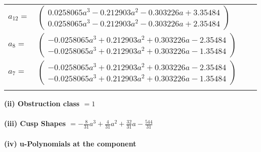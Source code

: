\documentclass[1p]{elsarticle_modified}
\theoremstyle{definition}
\begin{document}
\begin{tabular}{m{7pt} m{180pt} m{7pt} m{180pt} }
\flushright $a_{12}=$&$\begin{pmatrix}0.0258065 a^{3}-0.212903 a^{2}-0.303226 a+3.35484\\0.0258065 a^{3}-0.212903 a^{2}-0.303226 a+2.35484\end{pmatrix}$ \\
\flushright $a_{8}=$&$\begin{pmatrix}-0.0258065 a^{3}+0.212903 a^{2}+0.303226 a-2.35484\\-0.0258065 a^{3}+0.212903 a^{2}+0.303226 a-1.35484\end{pmatrix}$ \\
\flushright $a_{7}=$&$\begin{pmatrix}-0.0258065 a^{3}+0.212903 a^{2}+0.303226 a-2.35484\\-0.0258065 a^{3}+0.212903 a^{2}+0.303226 a-1.35484\end{pmatrix}$\\&\end{tabular}
\flushleft \textbf{(ii) Obstruction class $= 1$}\\~\\
\flushleft \textbf{(iii) Cusp Shapes $= -\frac{8}{31} a^3+\frac{4}{31} a^2+\frac{32}{31} a-\frac{544}{31}$}\\~\\
\newpage\renewcommand{\arraystretch}{1}
\flushleft \textbf{(iv) u-Polynomials at the component}\newline \\
\end{document}
